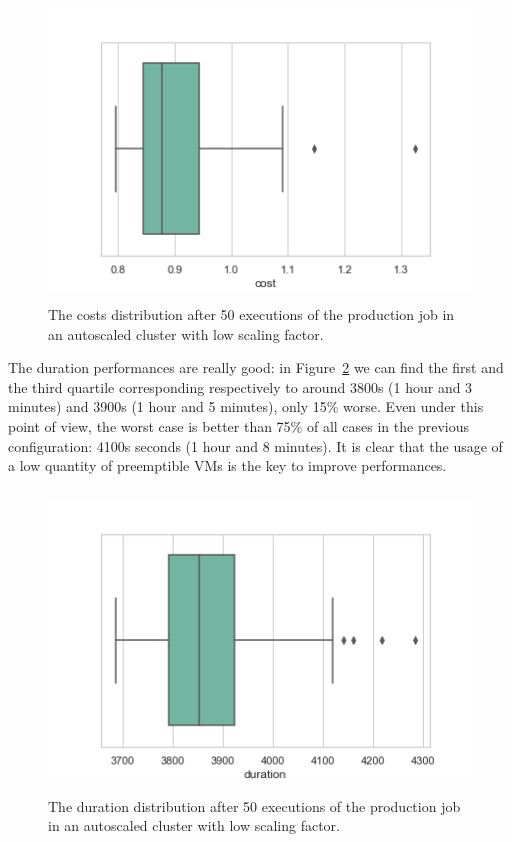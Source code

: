 \documentclass[12pt,twoside,cucitura]{toptesi}
\begin{document}
\begin{figure}
\centering
\includegraphics[height=80mm]{low-cost}
\caption{The costs distribution after 50 executions of the production job in an autoscaled cluster with low scaling factor.}\label{fig:low-cost}
\end{figure}

The duration performances are really good: in Figure~\ref{fig:low-duration} we can find the first and the third quartile corresponding respectively to around 3800s (1 hour and 3 minutes) and 3900s (1 hour and 5 minutes), only 15\% worse. Even under this point of view, the worst case is better than 75\% of all cases in the previous configuration: 4100s seconds (1 hour and 8 minutes). It is clear that the usage of a low quantity of preemptible VMs is the key to improve performances.

\begin{figure}
\centering
\includegraphics[height=80mm]{low-duration}
\caption{The duration distribution after 50 executions of the production job in an autoscaled cluster with low scaling factor.}\label{fig:low-duration}
\end{figure}
\end{document}
